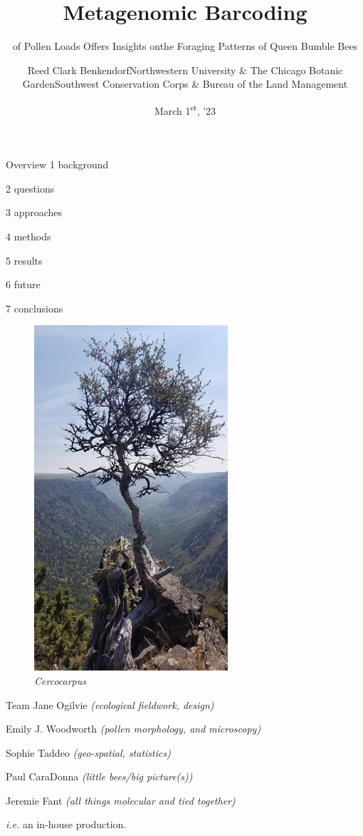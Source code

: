 \documentclass[
  ignorenonframetext,
]{beamer}
\title{Metagenomic Barcoding}
\subtitle{of Pollen Loads Offers Insights onthe Foraging Patterns of
Queen Bumble Bees}
\author{Reed Clark BenkendorfNorthwestern University \& The Chicago
Botanic GardenSouthwest Conservation Corps \& Bureau of the Land
Management}
\date{March 1\textsuperscript{st}, '23}
\begin{document}
\frame{\titlepage}

\begin{frame}
\end{frame}

\begin{frame}{Overview}
\protect\hypertarget{overview}{}
1 \textbar{} background

2 \textbar{} questions

3 \textbar{} approaches

4 \textbar{} methods

5 \textbar{} results

6 \textbar{} future

7 \textbar{} conclusions

\begin{figure}
\centering
\includegraphics{../graphics/pictures/Cercocarpus-Steens.resized.jpg}
\caption{ \emph{Cercocarpus} }
\end{figure}
\end{frame}

\begin{frame}{Team}
\protect\hypertarget{team}{}
Jane Ogilvie \emph{(ecological fieldwork, design)}

Emily J. Woodworth \emph{(pollen morphology, and microscopy)}

Sophie Taddeo \emph{(geo-spatial, statistics)}

Paul CaraDonna \emph{(little bees/big picture(s))}

Jeremie Fant \emph{(all things molecular and tied together)}

\emph{i.e.} an in-house production.
\end{frame}
\end{document}
